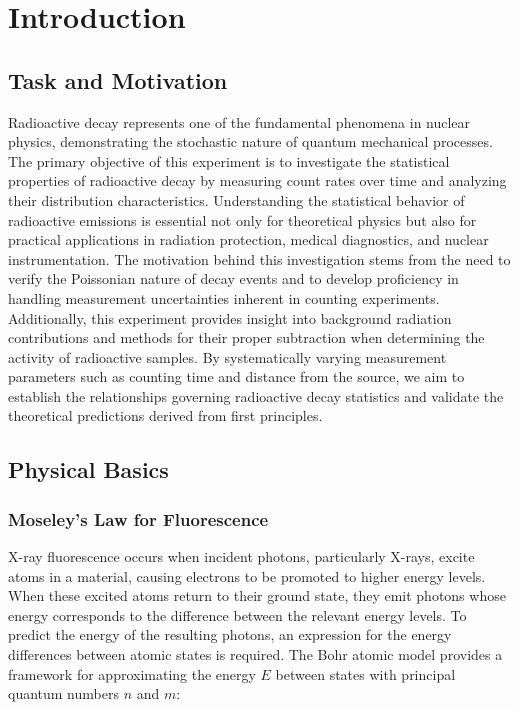 \chapter{Introduction} \label{ch:Introduction}

\section{Task and Motivation} \label{sec:TaskAndMotivation}
Radioactive decay represents one of the fundamental phenomena in nuclear physics, demonstrating the stochastic nature of quantum mechanical processes. The primary objective of this experiment is to investigate the statistical properties of radioactive decay by measuring count rates over time and analyzing their distribution characteristics. Understanding the statistical behavior of radioactive emissions is essential not only for theoretical physics but also for practical applications in radiation protection, medical diagnostics, and nuclear instrumentation. The motivation behind this investigation stems from the need to verify the Poissonian nature of decay events and to develop proficiency in handling measurement uncertainties inherent in counting experiments. Additionally, this experiment provides insight into background radiation contributions and methods for their proper subtraction when determining the activity of radioactive samples. By systematically varying measurement parameters such as counting time and distance from the source, we aim to establish the relationships governing radioactive decay statistics and validate the theoretical predictions derived from first principles.

\section{Physical Basics} \label{sec:PhysicalBasics}

\subsection{Moseley's Law for Fluorescence} \label{subsec:moseleys_law}
X-ray fluorescence occurs when incident photons, particularly X-rays, excite atoms in a material, causing electrons to be promoted to higher energy levels. When these excited atoms return to their ground state, they emit photons whose energy corresponds to the difference between the relevant energy levels. To predict the energy of the resulting photons, an expression for the energy differences between atomic states is required. The Bohr atomic model provides a framework for approximating the energy $E$ between states with principal quantum numbers $n$ and $m$:

